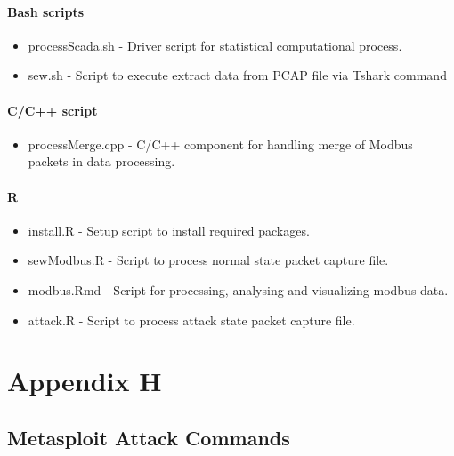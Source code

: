 \documentclass[11pt,]{article}
\begin{document}
\paragraph*{Bash scripts}\label{bash-scripts}

\begin{itemize}
\itemsep1pt\parskip0pt
\item
  processScada.sh - Driver script for statistical computational process.
\item
  sew.sh - Script to execute extract data from PCAP file via Tshark
  command
\end{itemize}

\paragraph*{C/C++ script}\label{cc-script}

\begin{itemize}
\itemsep1pt\parskip0pt
\item
  processMerge.cpp - C/C++ component for handling merge of Modbus
  packets in data processing.
\end{itemize}

\paragraph*{R}\label{r}

\begin{itemize}
\itemsep1pt\parskip0pt
\item
  install.R - Setup script to install required packages.
\item
  sewModbus.R - Script to process normal state packet capture file.
\item
  modbus.Rmd - Script for processing, analysing and visualizing modbus
  data.
\item
  attack.R - Script to process attack state packet capture file.
\end{itemize}

\newpage

\section*{Appendix H}\label{appendix-h}

\subsection*{Metasploit Attack
Commands}\label{metasploit-attack-commands}
\end{document}
